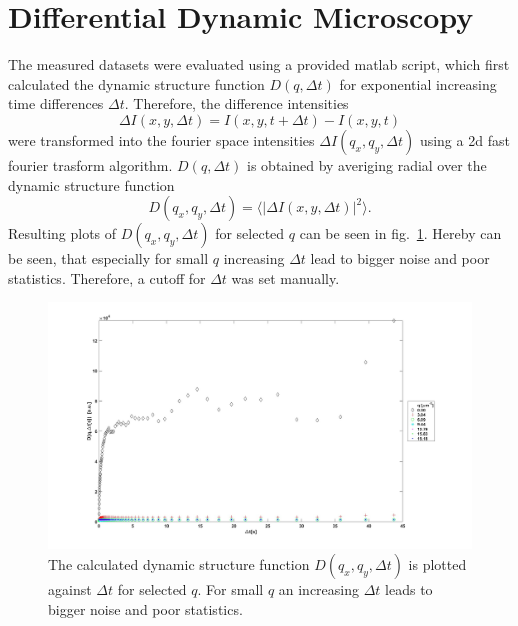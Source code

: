 \section{Differential Dynamic Microscopy}\label{sec:DDMDis}
The measured datasets were evaluated using a provided matlab script, which first calculated the dynamic structure function $D(q,\Delta t)$ for exponential increasing time differences $\Delta t$. Therefore, the difference intensities 
\begin{equation}
    \Delta I(x,y,\Delta t) = I(x,y,t+\Delta t) - I(x,y,t)
\end{equation}
were transformed into the fourier space intensities $\Delta I(q_x,q_y,\Delta t)$ using a 2d fast fourier trasform algorithm. $D(q,\Delta t)$ is obtained by averiging radial over the dynamic structure function 
\begin{equation}
    D(q_x,q_y,\Delta t) = \langle |\Delta I(x,y,\Delta t)|^2 \rangle.
\end{equation}
Resulting plots of $D(q_x,q_y,\Delta t)$ for selected $q$ can be seen in fig.~\ref{fig:DvsDeltat}. Hereby can be seen, that especially for small $q$ increasing $\Delta t$ lead to bigger noise and poor statistics. Therefore, a cutoff for $\Delta t$ was set manually. \par 

\begin{figure}[ht]
    \centering
    \includegraphics[width = \textwidth]{Bilder/Auswertung/DDM/d vs detat.jpg}
    \caption{The calculated dynamic structure function $D(q_x,q_y,\Delta t)$ is plotted against $\Delta t$ for selected $q$. For small $q$ an increasing $\Delta t$ leads to bigger noise and poor statistics.}
    \label{fig:DvsDeltat}
\end{figure}

